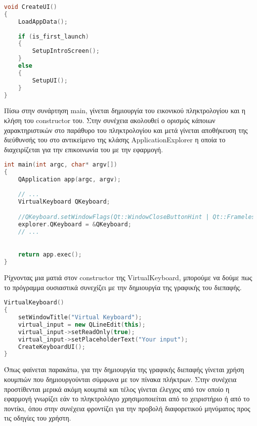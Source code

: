 \begin{lstlisting}[language=C++, style=cppstyle]
void CreateUI() 
{
    LoadAppData();
    
    if (is_first_launch)
    {
        SetupIntroScreen();
    }
    else
    {
        SetupUI();
    }
}
\end{lstlisting}

Πίσω στην συνάρτηση main, γίνεται δημιουργία του εικονικού πληκτρολογίου και η κλήση του constructor
του. Στην συνέχεια ακολουθεί ο ορισμός κάποιων χαρακτηριστικών στο παράθυρο του πληκτρολογίου και 
μετά γίνεται αποθήκευση της διεύθυνσής του στο αντικείμενο της κλάσης ApplicationExplorer η οποία
το διαχειρίζεται για την επικοινωνία του με την εφαρμογή.

\begin{lstlisting}[language=C++, style=cppstyle]
int main(int argc, char* argv[]) 
{
    QApplication app(argc, argv);
    
    // ...
    VirtualKeyboard QKeyboard;

    //QKeyboard.setWindowFlags(Qt::WindowCloseButtonHint | Qt::FramelessWindowHint);
    explorer.QKeyboard = &QKeyboard;
    // ...

    
    return app.exec();
}
\end{lstlisting}

Ρίχνοντας μια ματιά στον constructor της VirtualKeyboard, μπορούμε να δούμε πως το πρόγραμμα ουσιαστικά
συνεχίζει με την δημιουργία της γραφικής του διεπαφής.

\begin{lstlisting}[language=C++, style=cppstyle]
VirtualKeyboard()
{
    setWindowTitle("Virtual Keyboard");
    virtual_input = new QLineEdit(this);
    virtual_input->setReadOnly(true);
    virtual_input->setPlaceholderText("Your input");
    CreateKeyboardUI();
}
\end{lstlisting}

Όπως φαίνεται παρακάτω, για την δημιουργία της γραφικής διεπαφής γίνεται χρήση κουμπιών που δημιουργούνται
σύμφωνα με τον πίνακα πλήκτρων. Στην συνέχεια προστίθενται μερικά ακόμη κουμπιά και τέλος γίνεται έλεγχος 
από τον οποίο η εφαρμογή γνωρίζει εάν το πληκτρολόγιο χρησιμοποιείται από το χειριστήριο ή από το ποντίκι,
όπου στην συνέχεια φροντίζει για την προβολή διαφορετικού μηνύματος προς τις οδηγίες του χρήστη.

